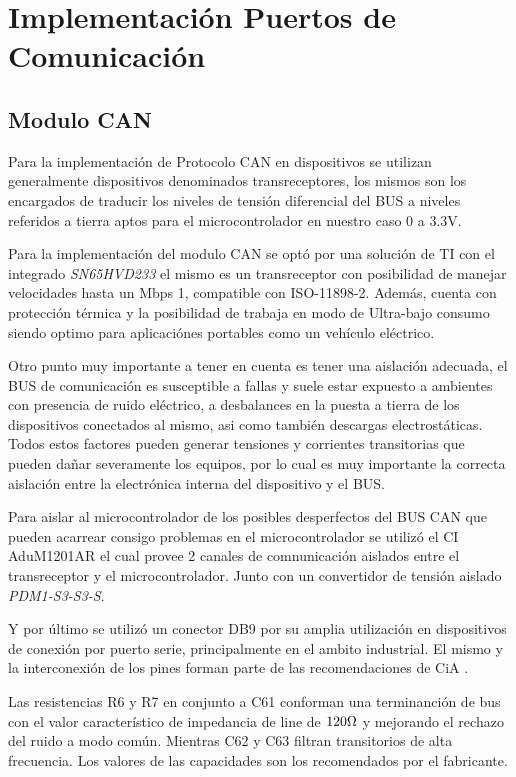 \documentclass[10pt, a4paper]{report}
\begin{document}
\section{Implementación Puertos de Comunicación}
\subsection{Modulo CAN}
Para la implementación de Protocolo CAN en dispositivos se utilizan generalmente 
dispositivos denominados transreceptores, los mismos son los encargados de 
traducir los niveles de tensión diferencial del BUS a niveles referidos a tierra 
aptos para el microcontrolador en nuestro caso 0 a 3.3V. 

Para la implementación del modulo CAN se optó por una solución de TI con el 
integrado \emph{SN65HVD233} el mismo es un transreceptor con posibilidad de 
manejar velocidades hasta un Mbps 1, compatible con ISO-11898-2.
Además, cuenta con protección térmica y la posibilidad de trabaja en modo de 
Ultra-bajo consumo siendo optimo para aplicaciónes portables como un vehículo 
eléctrico.

Otro punto muy importante a tener en cuenta es tener una aislación adecuada, el 
BUS de comunicación es susceptible a fallas y suele estar expuesto a ambientes 
con presencia de ruido eléctrico, a desbalances en la puesta a tierra de los 
dispositivos conectados al mismo, asi como también descargas electrostáticas. 
Todos estos factores pueden generar tensiones y corrientes transitorias que 
pueden dañar severamente los equipos, por lo cual es muy importante la correcta 
aislación entre la electrónica interna del dispositivo y el BUS.

Para aislar al microcontrolador de los posibles desperfectos del BUS CAN que 
pueden acarrear consigo problemas en el microcontrolador se utilizó el
\acrshort{CI} AduM1201AR el cual provee 2 canales de comnunicación aislados 
entre el transreceptor y el microcontrolador. Junto con un convertidor de 
tensión aislado \emph{PDM1-S3-S3-S}.

Y por último se utilizó un conector DB9 por su amplia utilización en 
dispositivos de conexión por puerto serie, principalmente en el ambito 
industrial. El mismo y la interconexión de los pines forman parte de las 
recomendaciones de \acrshort{CiA} \cite{CIA2017}.    

Las resistencias R6 y R7 en conjunto a C61 conforman una terminanción de bus 
con el valor característico de impedancia de line de $120 \ohm$ y mejorando el 
rechazo del ruido a modo común. Mientras C62 y C63 filtran transitorios de alta 
frecuencia. Los valores de las capacidades son los recomendados por el 
fabricante. 
\end{document}
